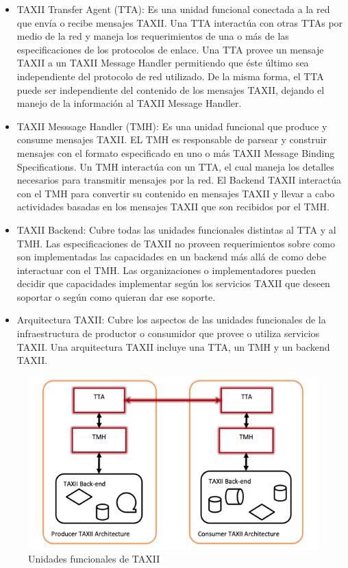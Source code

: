 \begin{itemize}
  \item TAXII Transfer Agent (TTA): Es una unidad funcional conectada a la red 
  que envía o recibe mensajes TAXII. Una TTA interactúa con otras TTAs por medio 
  de la red y maneja los requerimientos de una o más de las especificaciones de 
  los protocolos de enlace. Una TTA provee un mensaje TAXII a un TAXII Message 
  Handler permitiendo que éste último sea independiente del protocolo de red 
  utilizado. De la misma forma, el TTA puede ser independiente del contenido de 
  los mensajes TAXII, dejando el manejo de la información al TAXII Message 
  Handler.
  \item TAXII Messsage Handler (TMH): Es una unidad funcional que produce y 
  consume mensajes TAXII. EL TMH es responsable de parsear y construir mensajes 
  con el formato especificado en uno o más TAXII Message Binding Specifications. 
  Un TMH interactúa con un TTA, el cual maneja los detalles necesarios para 
  transmitir mensajes por la red. El Backend TAXII interactúa con el TMH para 
  convertir su contenido en mensajes TAXII y llevar a cabo actividades basadas 
  en los mensajes TAXII que son recibidos por el TMH.
  \item TAXII Backend: Cubre todas las unidades funcionales distintas al TTA y 
  al TMH. Las especificaciones de TAXII no proveen requerimientos sobre como son 
  implementadas las capacidades en un backend más allá de como debe interactuar 
  con el TMH. Las organizaciones o implementadores pueden decidir que 
  capacidades implementar según los servicios TAXII que deseen soportar o según 
  como quieran dar ese soporte.
  \item Arquitectura TAXII: Cubre los aspectos de las unidades funcionales de la 
  infraestructura de productor o consumidor que provee o utiliza servicios 
  TAXII. Una arquitectura TAXII incluye una TTA, un TMH y un backend TAXII.
  \end{itemize}

\begin{figure}[ht!]
  \centering
    \includegraphics[width=150mm]{./images/TAXIIArchitecture.png}
    \caption{Unidades funcionales de TAXII \protect\cite{b1}}
\end{figure}

